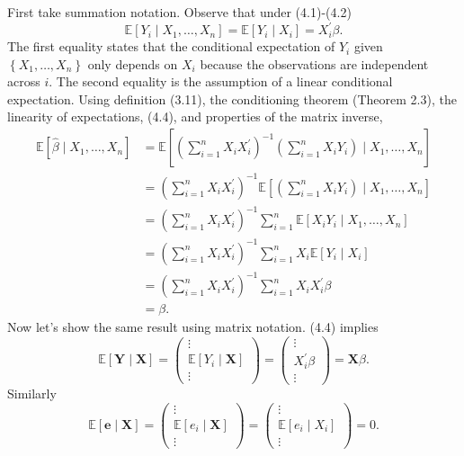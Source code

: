 \documentclass[10pt]{article}
\begin{document}
First take summation notation. Observe that under (4.1)-(4.2)
$$
\mathbb{E}\left[Y_{i} \mid X_{1}, \ldots, X_{n}\right]=\mathbb{E}\left[Y_{i} \mid X_{i}\right]=X_{i}^{\prime} \beta .
$$
The first equality states that the conditional expectation of $Y_{i}$ given $\left\{X_{1}, \ldots, X_{n}\right\}$ only depends on $X_{i}$ because the observations are independent across $i$. The second equality is the assumption of a linear conditional expectation. Using definition (3.11), the conditioning theorem (Theorem 2.3), the linearity of expectations, (4.4), and properties of the matrix inverse,
$$
\begin{aligned}
\mathbb{E}\left[\widehat{\beta} \mid X_{1}, \ldots, X_{n}\right] &=\mathbb{E}\left[\left(\sum_{i=1}^{n} X_{i} X_{i}^{\prime}\right)^{-1}\left(\sum_{i=1}^{n} X_{i} Y_{i}\right) \mid X_{1}, \ldots, X_{n}\right] \\
&=\left(\sum_{i=1}^{n} X_{i} X_{i}^{\prime}\right)^{-1} \mathbb{E}\left[\left(\sum_{i=1}^{n} X_{i} Y_{i}\right) \mid X_{1}, \ldots, X_{n}\right] \\
&=\left(\sum_{i=1}^{n} X_{i} X_{i}^{\prime}\right)^{-1} \sum_{i=1}^{n} \mathbb{E}\left[X_{i} Y_{i} \mid X_{1}, \ldots, X_{n}\right] \\
&=\left(\sum_{i=1}^{n} X_{i} X_{i}^{\prime}\right)^{-1} \sum_{i=1}^{n} X_{i} \mathbb{E}\left[Y_{i} \mid X_{i}\right] \\
&=\left(\sum_{i=1}^{n} X_{i} X_{i}^{\prime}\right)^{-1} \sum_{i=1}^{n} X_{i} X_{i}^{\prime} \beta \\
&=\beta .
\end{aligned}
$$
Now let's show the same result using matrix notation. (4.4) implies
$$
\mathbb{E}[\boldsymbol{Y} \mid \boldsymbol{X}]=\left(\begin{array}{c}
\vdots \\
\mathbb{E}\left[Y_{i} \mid \boldsymbol{X}\right] \\
\vdots
\end{array}\right)=\left(\begin{array}{c}
\vdots \\
X_{i}^{\prime} \beta \\
\vdots
\end{array}\right)=\boldsymbol{X} \beta .
$$
Similarly
$$
\mathbb{E}[\boldsymbol{e} \mid \boldsymbol{X}]=\left(\begin{array}{c}
\vdots \\
\mathbb{E}\left[e_{i} \mid \boldsymbol{X}\right] \\
\vdots
\end{array}\right)=\left(\begin{array}{c}
\vdots \\
\mathbb{E}\left[e_{i} \mid X_{i}\right] \\
\vdots
\end{array}\right)=0 .
$$
\end{document}
